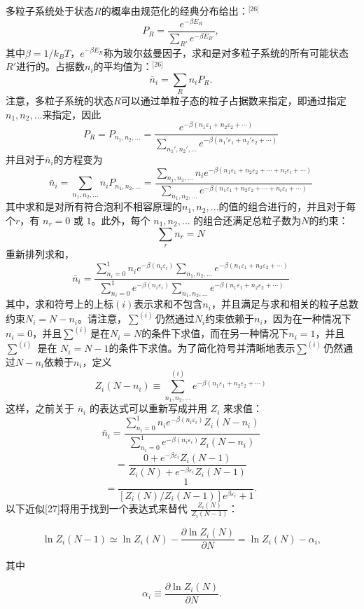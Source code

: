多粒子系统处于状态\(R\)的概率由规范化的经典分布给出：\(^\text{[26]}\)
\[
P_R = \frac{e^{-\beta E_R}}{\sum_{R'} e^{-\beta E_{R'}}},~
\]
其中\(\beta = 1/k_B T\)，\( e^{-\beta E_R} \)称为玻尔兹曼因子，求和是对多粒子系统的所有可能状态\(R'\)进行的。占据数\(n_i\)的平均值为：\(^\text{[26]}\)
\[
\bar{n}_i = \sum_R n_i P_R.~
\]
注意，多粒子系统的状态\(R\)可以通过单粒子态的粒子占据数来指定，即通过指定\( n_1, n_2, \ldots\)来指定，因此
\[
P_R = P_{n_1, n_2, \ldots} = \frac{e^{-\beta (n_1 \varepsilon_1 + n_2 \varepsilon_2 + \cdots )}}{\sum_{n_1', n_2', \ldots} e^{-\beta (n_1' \varepsilon_1 + n_2' \varepsilon_2 + \cdots )}}~
\]
并且对于\(\bar{n}_i\)的方程变为
\[
\bar{n}_i = \sum_{n_1, n_2, \dots} n_i P_{n_1, n_2, \dots} = \frac{\sum_{n_1, n_2, \dots} n_i e^{-\beta (n_1 \varepsilon_1 + n_2 \varepsilon_2 + \cdots + n_i \varepsilon_i + \cdots )}}{\sum_{n_1, n_2, \dots} e^{-\beta (n_1 \varepsilon_1 + n_2 \varepsilon_2 + \cdots + n_i \varepsilon_i + \cdots )}}~
\]
其中求和是对所有符合泡利不相容原理的\(n_1, n_2, \ldots\)的值的组合进行的，并且对于每个\( r \)，有 \( n_r = 0 \) 或 \( 1 \)。此外，每个 \( n_1, n_2, \ldots \) 的组合还满足总粒子数为\(N\)的约束：
\[
\sum_r n_r = N~
\]
重新排列求和，
\[
\bar{n}_i = \frac{\sum_{n_i=0}^{1} n_i e^{-\beta (n_i \varepsilon_i)} \sum_{n_1, n_2, \dots} e^{-\beta (n_1 \varepsilon_1 + n_2 \varepsilon_2 + \cdots )}}{\sum_{n_i=0}^{1} e^{-\beta (n_i \varepsilon_i)} \sum_{n_1, n_2, \dots} e^{-\beta (n_1 \varepsilon_1 + n_2 \varepsilon_2 + \cdots )}}~
\]
其中，求和符号上的上标\( (i) \)表示求和不包含\( n_i \)，并且满足与求和相关的粒子总数约束\( N_i = N - n_i \)。请注意，\( \sum^{(i)} \)仍然通过\( N_i \)约束依赖于\( n_i \)，因为在一种情况下\( n_i = 0 \)，并且\( \sum^{(i)} \)是在\( N_i = N \)的条件下求值，而在另一种情况下\( n_i = 1 \)，并且\( \sum^{(i)} \) 是在 \( N_i = N - 1 \)的条件下求值。为了简化符号并清晰地表示\( \sum^{(i)} \)仍然通过\( N - n_i \)依赖于\( n_i \)，定义
\[
Z_i(N - n_i) \equiv \sum^{(i)}_{n_1, n_2, \dots} e^{-\beta (n_1 \varepsilon_1 + n_2 \varepsilon_2 + \cdots )}~
\]
这样，之前关于 \( \bar{n}_i \) 的表达式可以重新写成并用 \( Z_i \) 来求值：
\[
\bar{n}_i = \frac{\sum_{n_i=0}^{1} n_i e^{-\beta (n_i \varepsilon_i)} Z_i(N - n_i)}{\sum_{n_i=0}^{1} e^{-\beta (n_i \varepsilon_i)} Z_i(N - n_i)}~
\]
\[= \frac{0 + e^{-\beta \varepsilon_i} Z_i(N - 1)}{Z_i(N) + e^{-\beta \varepsilon_i} Z_i(N - 1)}~
\]
\[
= \frac{1}{\left[Z_i(N)/Z_i(N - 1) \right] e^{\beta \varepsilon_i} + 1}.~
\]
以下近似[27]将用于找到一个表达式来替代 \( \frac{Z_i(N)}{Z_i(N-1)} \)：

\[
\ln Z_i(N-1) \simeq \ln Z_i(N) - \frac{\partial \ln Z_i(N)}{\partial N} = \ln Z_i(N) - \alpha_i,
\]

其中

\[
\alpha_i \equiv \frac{\partial \ln Z_i(N)}{\partial N}.
\]